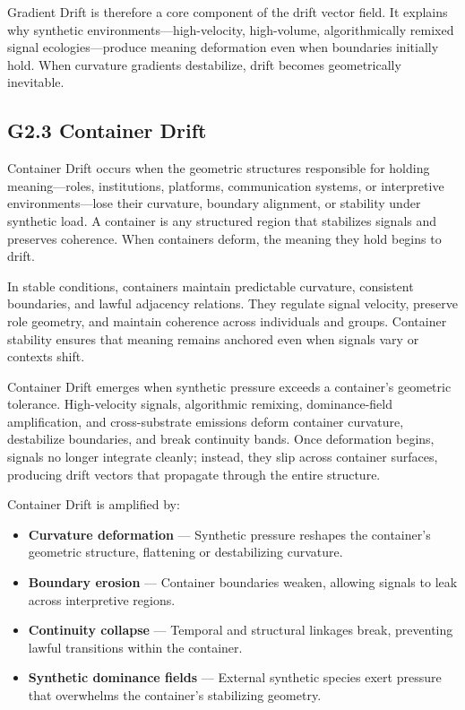\medskip

\noindent Gradient Drift is therefore a core component of the drift vector field.
It explains why synthetic environments—high-velocity, high-volume,
algorithmically remixed signal ecologies—produce meaning deformation even when
boundaries initially hold. When curvature gradients destabilize, drift becomes
geometrically inevitable.
\subsection*{G2.3 Container Drift}

\noindent Container Drift occurs when the geometric structures responsible for
holding meaning—roles, institutions, platforms, communication systems, or
interpretive environments—lose their curvature, boundary alignment, or stability
under synthetic load. A container is any structured region that stabilizes
signals and preserves coherence. When containers deform, the meaning they hold
begins to drift.

\medskip

\noindent In stable conditions, containers maintain predictable curvature,
consistent boundaries, and lawful adjacency relations. They regulate signal
velocity, preserve role geometry, and maintain coherence across individuals and
groups. Container stability ensures that meaning remains anchored even when
signals vary or contexts shift.

\medskip

\noindent Container Drift emerges when synthetic pressure exceeds a container’s
geometric tolerance. High-velocity signals, algorithmic remixing, dominance-field
amplification, and cross-substrate emissions deform container curvature,
destabilize boundaries, and break continuity bands. Once deformation begins,
signals no longer integrate cleanly; instead, they slip across container
surfaces, producing drift vectors that propagate through the entire structure.

\medskip

\noindent Container Drift is amplified by:

\begin{itemize}[leftmargin=1.2cm]
    \item \textbf{Curvature deformation} — Synthetic pressure reshapes the
    container’s geometric structure, flattening or destabilizing curvature.

    \item \textbf{Boundary erosion} — Container boundaries weaken, allowing
    signals to leak across interpretive regions.

    \item \textbf{Continuity collapse} — Temporal and structural linkages break,
    preventing lawful transitions within the container.

    \item \textbf{Synthetic dominance fields} — External synthetic species exert
    pressure that overwhelms the container’s stabilizing geometry.
\end{itemize}

